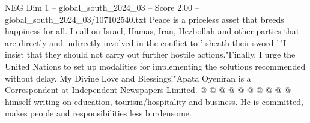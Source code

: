 \begin{textsample}{NEG Dim 1 – global\_south\_2024\_03 – Score 2.00 – global\_south\_2024\_03/107102540.txt}
Peace is a priceless asset that breeds happiness for all.
I call on Israel, Hamas, Iran, Hezbollah and other parties that are directly and indirectly involved in the conflict to ' sheath their sword '."I insist that they should not carry out further hostile actions."Finally, I urge the United Nations to set up modalities for implementing the solutions recommended without delay.
My Divine Love and Blessings!"Apata Oyeniran is a Correspondent at Independent Newspapers Limited. @ @ @ @ @ @ @ @ @ @ himself writing on education, tourism/hospitality and business.
He is committed, makes people and responsibilities less burdensome.

\end{textsample}
